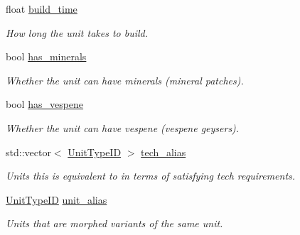 \begin{DoxyCompactItemize}
float \hyperlink{structsc2_1_1_unit_type_data_adb840df20a1c511098b99cd3afb41ec1}{build\+\_\+time}
\begin{DoxyCompactList}\small\item\em How long the unit takes to build. \end{DoxyCompactList}\item 
\mbox{\label{structsc2_1_1_unit_type_data_a8ce8f358c201c051674f9e1e548abd62}} 
bool \hyperlink{structsc2_1_1_unit_type_data_a8ce8f358c201c051674f9e1e548abd62}{has\+\_\+minerals}
\begin{DoxyCompactList}\small\item\em Whether the unit can have minerals (mineral patches). \end{DoxyCompactList}\item 
\mbox{\label{structsc2_1_1_unit_type_data_a00e3357be994388d2bf2c8e7755077ce}} 
bool \hyperlink{structsc2_1_1_unit_type_data_a00e3357be994388d2bf2c8e7755077ce}{has\+\_\+vespene}
\begin{DoxyCompactList}\small\item\em Whether the unit can have vespene (vespene geysers). \end{DoxyCompactList}\item 
\mbox{\label{structsc2_1_1_unit_type_data_a2cd00ee675ab4280fa6e8bfeef27061a}} 
std\+::vector$<$ \hyperlink{classsc2_1_1_s_c2_type}{Unit\+Type\+ID} $>$ \hyperlink{structsc2_1_1_unit_type_data_a2cd00ee675ab4280fa6e8bfeef27061a}{tech\+\_\+alias}
\begin{DoxyCompactList}\small\item\em Units this is equivalent to in terms of satisfying tech requirements. \end{DoxyCompactList}\item 
\mbox{\label{structsc2_1_1_unit_type_data_a7eab1514d1c6eb9fd5450ac023e11279}} 
\hyperlink{classsc2_1_1_s_c2_type}{Unit\+Type\+ID} \hyperlink{structsc2_1_1_unit_type_data_a7eab1514d1c6eb9fd5450ac023e11279}{unit\+\_\+alias}
\begin{DoxyCompactList}\small\item\em Units that are morphed variants of the same unit. \end{DoxyCompactList}\item 

\end{DoxyCompactItemize}

